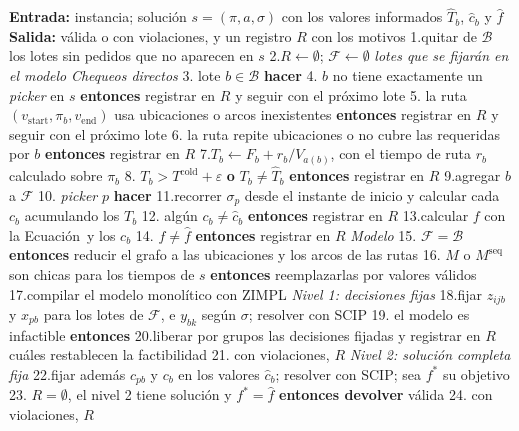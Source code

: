 \startplacefigure[title={Pseudocódigo del verificador de soluciones.}, reference=fig:verificador_pseudocodigo]
\startframedtext[width=broad, frame=on, align=flushleft]
\startlines
{\bf Entrada:} instancia; solución $s = (\pi, a, \sigma)$ con los valores informados $\hat{T}_b$, $\hat{c}_b$ y $\hat{f}$
{\bf Salida:} válida o con violaciones, y un registro $R$ con los motivos
1.\quad quitar de $\mathcal{B}$ los lotes sin pedidos que no aparecen en $s$
2.\quad $R \leftarrow \emptyset$;\; $\mathcal{F} \leftarrow \emptyset$ \hfill {\em lotes que se fijarán en el modelo}
{\em Chequeos directos}
3. lote $b \in \mathcal{B}$ {\bf hacer}
4.\quad{} $b$ no tiene exactamente un {\em picker} en $s$ {\bf entonces}
\dontleavehmode\hphantom{00.}\quad\qquad\qquad registrar en $R$ y seguir con el próximo lote
5.\quad{} la ruta $(v_{\text{start}}, \pi_b, v_{\text{end}})$ usa ubicaciones o arcos inexistentes {\bf entonces}
\dontleavehmode\hphantom{00.}\quad\qquad\qquad registrar en $R$ y seguir con el próximo lote
6.\quad{} la ruta repite ubicaciones o no cubre las requeridas por $b$ {\bf entonces}
\dontleavehmode\hphantom{00.}\quad\qquad\qquad registrar en $R$
7.\quad\qquad $T_b \leftarrow F_b + r_b / V_{a(b)}$, con el tiempo de ruta $r_b$ calculado sobre $\pi_b$
8.\quad{} $T_b > T^{\text{cold}} + \varepsilon$ {\bf o} $T_b \neq \hat{T}_b$ {\bf entonces} registrar en $R$
9.\quad\qquad agregar $b$ a $\mathcal{F}$
10. {\em picker} $p$ {\bf hacer}
11.\quad\qquad recorrer $\sigma_p$ desde el instante de inicio y calcular cada $c_b$ acumulando los $T_b$
12.\quad{} algún $c_b \neq \hat{c}_b$ {\bf entonces} registrar en $R$
13.\quad calcular $f$ con la Ecuación~ y los $c_b$
14. $f \neq \hat{f}$ {\bf entonces} registrar en $R$
{\em Modelo}
15. $\mathcal{F} = \mathcal{B}$ {\bf entonces} reducir el grafo a las ubicaciones y los arcos de las rutas
16. $M$ o $M^{\text{seq}}$ son chicas para los tiempos de $s$ {\bf entonces}
\dontleavehmode\hphantom{00.}\quad\qquad reemplazarlas por valores válidos
17.\quad compilar el modelo monolítico con ZIMPL
{\em Nivel 1: decisiones fijas}
18.\quad fijar $z_{ijb}$ y $x_{pb}$ para los lotes de $\mathcal{F}$, e $y_{bk}$ según $\sigma$; resolver con SCIP
19. el modelo es infactible {\bf entonces}
20.\quad\qquad liberar por grupos las decisiones fijadas y registrar en $R$
\dontleavehmode\hphantom{00.}\quad\qquad\qquad cuáles restablecen la factibilidad
21.\quad{} con violaciones, $R$
{\em Nivel 2: solución completa fija}
22.\quad fijar además $c_{pb}$ y $c_b$ en los valores $\hat{c}_b$; resolver con SCIP; sea $f^*$ su objetivo
23. $R = \emptyset$, el nivel 2 tiene solución y $f^* = \hat{f}$ {\bf entonces devolver} válida
24. con violaciones, $R$
\stoplines
\stopframedtext
\stopplacefigure

